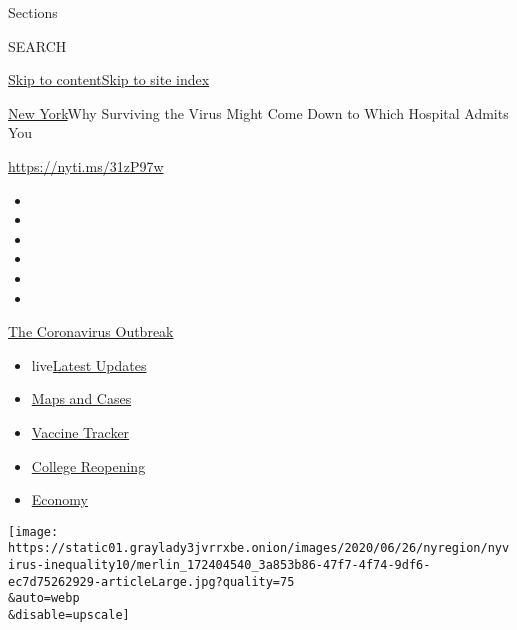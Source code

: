 Sections

SEARCH

\protect\hyperlink{site-content}{Skip to
content}\protect\hyperlink{site-index}{Skip to site index}

\href{/section/nyregion}{New York}\textbar{}Why Surviving the Virus
Might Come Down to Which Hospital Admits You

\url{https://nyti.ms/31zP97w}

\begin{itemize}
\item
\item
\item
\item
\item
\item
\end{itemize}

\href{https://www.nytimes3xbfgragh.onion/news-event/coronavirus?action=click\&pgtype=Article\&state=default\&region=TOP_BANNER\&context=storylines_menu}{The
Coronavirus Outbreak}

\begin{itemize}
\tightlist
\item
  live\href{https://www.nytimes3xbfgragh.onion/2020/08/04/world/coronavirus-cases.html?action=click\&pgtype=Article\&state=default\&region=TOP_BANNER\&context=storylines_menu}{Latest
  Updates}
\item
  \href{https://www.nytimes3xbfgragh.onion/interactive/2020/us/coronavirus-us-cases.html?action=click\&pgtype=Article\&state=default\&region=TOP_BANNER\&context=storylines_menu}{Maps
  and Cases}
\item
  \href{https://www.nytimes3xbfgragh.onion/interactive/2020/science/coronavirus-vaccine-tracker.html?action=click\&pgtype=Article\&state=default\&region=TOP_BANNER\&context=storylines_menu}{Vaccine
  Tracker}
\item
  \href{https://www.nytimes3xbfgragh.onion/2020/08/02/us/covid-college-reopening.html?action=click\&pgtype=Article\&state=default\&region=TOP_BANNER\&context=storylines_menu}{College
  Reopening}
\item
  \href{https://www.nytimes3xbfgragh.onion/live/2020/08/04/business/stock-market-today-coronavirus?action=click\&pgtype=Article\&state=default\&region=TOP_BANNER\&context=storylines_menu}{Economy}
\end{itemize}

\texttt{[image: https://static01.graylady3jvrrxbe.onion/images/2020/06/26/nyregion/nyvirus-inequality10/merlin\_172404540\_3a853b86-47f7-4f74-9df6-ec7d75262929-articleLarge.jpg?quality=75\\\&auto=webp\\\&disable=upscale]}

